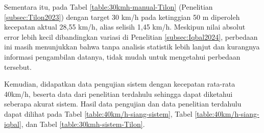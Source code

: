 Sementara itu, pada Tabel \ref{table:30kmh-manual-Tilon} (Penelitian \ref{subsec:Tilon2023}) dengan target 30 km/h pada ketinggian 50 m diperoleh kecepatan aktual 28,55 km/h, alias selisih 1,45 km/h. Meskipun nilai absolut error lebih kecil dibandingkan variasi di Penelitian \ref{subsec:Iqbal2024}, perbedaan ini masih menunjukkan bahwa tanpa analisis statistik lebih lanjut dan kurangnya informasi pengambilan datanya, tidak mudah untuk mengetahui perbedaan tersebut.

Kemudian, didapatkan data pengujian sistem dengan kecepatan rata-rata 40km/h, beserta data dari penelitian terdahulu sehingga dapat diketahui seberapa akurat sistem. Hasil data pengujian dan data penelitian terdahulu dapat dilihat pada Tabel \ref{table:40km/h-siang-sistem}, Tabel \ref{table:40km/h-siang-iqbal}, dan Tabel \ref{table:30kmh-sistem-Tilon}.

